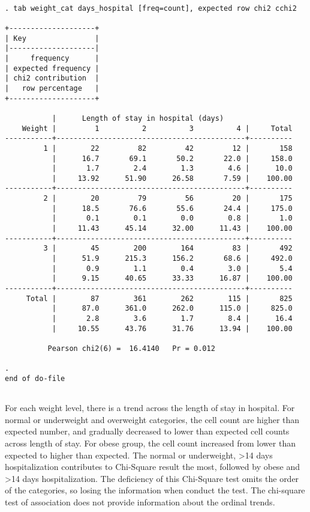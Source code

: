 \documentclass{article}
\begin{document}
\begin{verbatim}
    
. tab weight_cat days_hospital [freq=count], expected row chi2 cchi2

+--------------------+
| Key                |
|--------------------|
|     frequency      |
| expected frequency |
| chi2 contribution  |
|   row percentage   |
+--------------------+

           |      Length of stay in hospital (days)
    Weight |         1          2          3          4 |     Total
-----------+--------------------------------------------+----------
         1 |        22         82         42         12 |       158 
           |      16.7       69.1       50.2       22.0 |     158.0 
           |       1.7        2.4        1.3        4.6 |      10.0 
           |     13.92      51.90      26.58       7.59 |    100.00 
-----------+--------------------------------------------+----------
         2 |        20         79         56         20 |       175 
           |      18.5       76.6       55.6       24.4 |     175.0 
           |       0.1        0.1        0.0        0.8 |       1.0 
           |     11.43      45.14      32.00      11.43 |    100.00 
-----------+--------------------------------------------+----------
         3 |        45        200        164         83 |       492 
           |      51.9      215.3      156.2       68.6 |     492.0 
           |       0.9        1.1        0.4        3.0 |       5.4 
           |      9.15      40.65      33.33      16.87 |    100.00 
-----------+--------------------------------------------+----------
     Total |        87        361        262        115 |       825 
           |      87.0      361.0      262.0      115.0 |     825.0 
           |       2.8        3.6        1.7        8.4 |      16.4 
           |     10.55      43.76      31.76      13.94 |    100.00 

          Pearson chi2(6) =  16.4140   Pr = 0.012

. 
end of do-file
    
\end{verbatim}

For each weight level, there is a trend across the length of stay in hospital. For normal or underweight and overweight categories, the cell count are higher than expected number, and gradually decreased to lower than expected cell counts across length of stay. For obese group, the cell count increased from lower than expected to higher than expected. The normal or underweight, >14 days hospitalization contributes to Chi-Square result the most, followed by obese and >14 days hospitalization. The deficiency of this Chi-Square test omits the order of the categories, so losing the information when conduct the test.  The chi-square test of association does not provide information about the ordinal trends.
\end{document}
